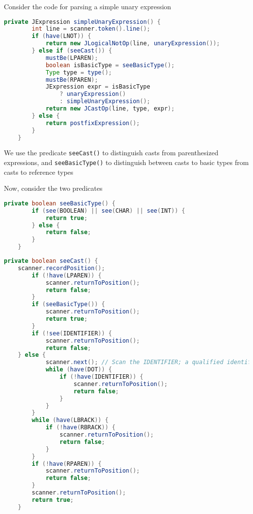 \documentclass[8pt,a4paper,compress]{beamer}
\begin{document}
\begin{frame}[fragile]
\pause

Consider the code for parsing a simple unary expression

\begin{lstlisting}[language=Java]
    private JExpression simpleUnaryExpression() {
        int line = scanner.token().line();
        if (have(LNOT)) {
            return new JLogicalNotOp(line, unaryExpression());
        } else if (seeCast()) {
            mustBe(LPAREN);
            boolean isBasicType = seeBasicType();
            Type type = type();
            mustBe(RPAREN);
            JExpression expr = isBasicType
                ? unaryExpression()
                : simpleUnaryExpression();
            return new JCastOp(line, type, expr);
        } else {
            return postfixExpression();
        }
    }
\end{lstlisting}

\pause
\bigskip

We use the predicate \lstinline{seeCast()} to distinguish casts from parenthesized expressions, and \lstinline{seeBasicType()} to distinguish between casts to basic types from casts to reference types

\pause
\bigskip

Now, consider the two predicates

\begin{lstlisting}[language=Java]
    private boolean seeBasicType() {
        if (see(BOOLEAN) || see(CHAR) || see(INT)) {
            return true;
        } else {
            return false;
        }
    }
\end{lstlisting}
\end{frame}

\begin{frame}[fragile]
\pause

\begin{lstlisting}[language=Java]
    private boolean seeCast() {
	scanner.recordPosition();
        if (!have(LPAREN)) {
            scanner.returnToPosition();
            return false;
        }
        if (seeBasicType()) {
            scanner.returnToPosition();
            return true;
        }
        if (!see(IDENTIFIER)) {
            scanner.returnToPosition();
            return false;
	} else {
            scanner.next(); // Scan the IDENTIFIER; a qualified identifier is ok
            while (have(DOT)) {
                if (!have(IDENTIFIER)) {
                    scanner.returnToPosition();
                    return false;
                }
            }
        }
        while (have(LBRACK)) {
            if (!have(RBRACK)) {
                scanner.returnToPosition();
                return false;
            }
        }
        if (!have(RPAREN)) {
            scanner.returnToPosition();
            return false;
        }
        scanner.returnToPosition();
        return true;
    }
\end{lstlisting}
\end{frame}
\end{document}
